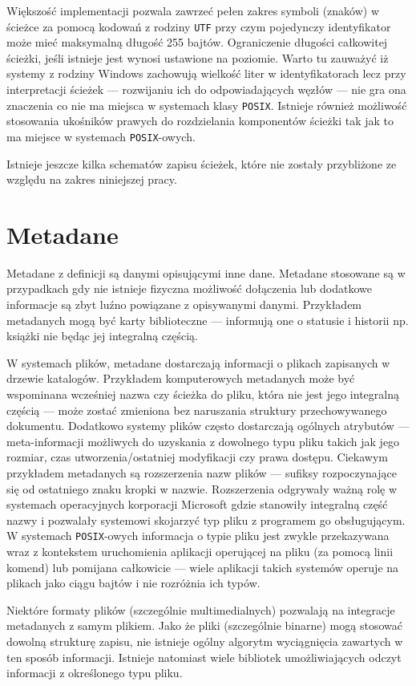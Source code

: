 \par
Większość implementacji pozwala zawrzeć pełen zakres symboli (znaków) w ścieżce za pomocą kodowań z rodziny \texttt{UTF} przy czym pojedynczy identyfikator może mieć maksymalną długość 255 bajtów. Ograniczenie długości całkowitej ścieżki, jeśli istnieje jest wynosi ustawione na poziomie.
Warto tu zauważyć iż systemy z rodziny Windows zachowują wielkość liter w identyfikatorach lecz przy interpretacji ścieżek --- rozwijaniu ich do odpowiadających węzłów --- nie gra ona znaczenia co nie ma miejsca w systemach klasy \texttt{POSIX}. Istnieje również możliwość stosowania ukośników prawych do rozdzielania komponentów ścieżki tak jak to ma miejsce w systemach \texttt{POSIX}-owych.

\par
Istnieje jeszcze kilka schematów zapisu ścieżek, które nie zostały przybliżone ze względu na zakres niniejszej pracy.

\clearpage

\section{Metadane}
\par
Metadane z definicji są danymi opisującymi inne dane. Metadane stosowane są w przypadkach gdy nie istnieje fizyczna możliwość dołączenia lub dodatkowe informacje są zbyt luźno powiązane z opisywanymi danymi.
Przykładem metadanych mogą być karty biblioteczne --- informują one o statusie i historii np. książki nie będąc jej integralną częścią.

\par
W systemach plików, metadane dostarczają informacji o plikach zapisanych w drzewie katalogów.
Przykładem komputerowych metadanych może być wspominana wcześniej nazwa czy ścieżka do pliku, która nie jest jego integralną częścią --- może zostać zmieniona bez naruszania struktury przechowywanego dokumentu.
Dodatkowo systemy plików często dostarczają ogólnych atrybutów --- meta-informacji możliwych do uzyskania z dowolnego typu pliku takich jak jego rozmiar, czas utworzenia/ostatniej modyfikacji czy prawa dostępu.
Ciekawym przykładem metadanych są rozszerzenia nazw plików --- sufiksy rozpoczynające się od ostatniego znaku kropki w nazwie. Rozszerzenia odgrywały ważną rolę w systemach operacyjnych korporacji Microsoft gdzie stanowiły integralną część nazwy i pozwalały systemowi skojarzyć typ pliku z programem go obsługującym. W systemach \texttt{POSIX}-owych informacja o typie pliku jest zwykle przekazywana wraz z kontekstem uruchomienia aplikacji operującej na pliku (za pomocą linii komend) lub pomijana całkowicie --- wiele aplikacji takich systemów operuje na plikach jako ciągu bajtów i nie rozróżnia ich typów.

\par
Niektóre formaty plików (szczególnie multimedialnych) pozwalają na integracje metadanych z samym plikiem. Jako że pliki (szczególnie binarne) mogą stosować dowolną strukturę zapisu, nie istnieje ogólny algorytm wyciągnięcia zawartych w ten sposób informacji. Istnieje natomiast wiele bibliotek umożliwiających odczyt informacji z określonego typu pliku.

\clearpage
